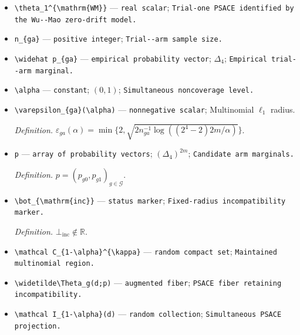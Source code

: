 \documentclass{article}
\begin{document}
\begin{itemize}
  \item \texttt{\textbackslash{}\allowbreak{}theta\_\allowbreak{}1\textasciicircum{}\{\textbackslash{}\allowbreak{}mathrm\{WM\}\allowbreak{}\}\allowbreak{}} --- \texttt{real scalar}; \texttt{Trial-\allowbreak{}one PSACE identified by the Wu-\allowbreak{}-\allowbreak{}Mao zero-\allowbreak{}drift model.}
  \item \texttt{n\_\allowbreak{}\{ga\}\allowbreak{}} --- \texttt{positive integer}; \texttt{Trial-\allowbreak{}-\allowbreak{}arm sample size.}
  \item \texttt{\textbackslash{}\allowbreak{}widehat p\_\allowbreak{}\{ga\}\allowbreak{}} --- \texttt{empirical probability vector}; \(\Delta_4\); \texttt{Empirical trial-\allowbreak{}-\allowbreak{}arm marginal.}
  \item \texttt{\textbackslash{}\allowbreak{}alpha} --- \texttt{constant}; \((0,1)\); \texttt{Simultaneous noncoverage level.}
  \item \texttt{\textbackslash{}\allowbreak{}varepsilon\_\allowbreak{}\{ga\}\allowbreak{}(\textbackslash{}\allowbreak{}alpha)} --- \texttt{nonnegative scalar}; Multinomial \(\ell_1\) radius.
  \par\smallskip\noindent\emph{Definition.} \(\varepsilon_{ga}(\alpha)=\min\{2,\sqrt{2n_{ga}^{-1}\log((2^4-2)2m/\alpha)}\}\).
  \item \texttt{p} --- \texttt{array of probability vectors}; \((\Delta_4)^{2m}\); \texttt{Candidate arm marginals.}
  \par\smallskip\noindent\emph{Definition.} \(p=(p_{g0},p_{g1})_{g\in\mathcal G}\).
  \item \texttt{\textbackslash{}\allowbreak{}bot\_\allowbreak{}\{\textbackslash{}\allowbreak{}mathrm\{inc\}\allowbreak{}\}\allowbreak{}} --- \texttt{status marker}; \texttt{Fixed-\allowbreak{}radius incompatibility marker.}
  \par\smallskip\noindent\emph{Definition.} \(\bot_{\mathrm{inc}}\notin\mathbb R\).
  \item \texttt{\textbackslash{}\allowbreak{}mathcal C\_\allowbreak{}\{1-\allowbreak{}\textbackslash{}\allowbreak{}alpha\}\allowbreak{}\textasciicircum{}\{\textbackslash{}\allowbreak{}kappa\}\allowbreak{}} --- \texttt{random compact set}; \texttt{Maintained multinomial region.}
  \item \texttt{\textbackslash{}\allowbreak{}widetilde\textbackslash{}\allowbreak{}Theta\_\allowbreak{}g(d;\allowbreak{}p)} --- \texttt{augmented fiber}; \texttt{PSACE fiber retaining incompatibility.}
  \item \texttt{\textbackslash{}\allowbreak{}mathcal I\_\allowbreak{}\{1-\allowbreak{}\textbackslash{}\allowbreak{}alpha\}\allowbreak{}(d)} --- \texttt{random collection}; \texttt{Simultaneous PSACE projection.}

\end{itemize}
\end{document}
